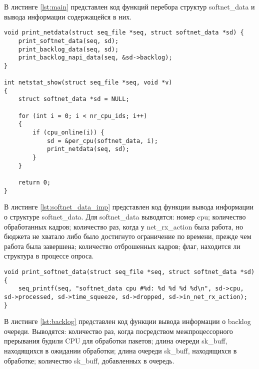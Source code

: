 В листинге \ref{lst:main} представлен код функций перебора структур softnet\_data и вывода информации содержащейся в них.

\begin{center}
	\captionsetup{justification=raggedright,singlelinecheck=off}
	\begin{lstlisting}[label=lst:main,caption=Функции перебора и вывода информации о структуре softnet\_data ,showstringspaces=false]
void print_netdata(struct seq_file *seq, struct softnet_data *sd) {
	print_softnet_data(seq, sd);
	print_backlog_data(seq, sd);
	print_backlog_napi_data(seq, &sd->backlog);
}

int netstat_show(struct seq_file *seq, void *v)
{
	struct softnet_data *sd = NULL;
	
	for (int i = 0; i < nr_cpu_ids; i++)
	{
		if (cpu_online(i)) {
			sd = &per_cpu(softnet_data, i);
			print_netdata(seq, sd);
		}
	}
	
	return 0;
}
	\end{lstlisting}
\end{center}
\FloatBarrier

В листинге \ref{lst:softnet_data_imp} представлен код функции вывода информации о структуре softnet\_data. Для softnet\_data выводятся: номер cpu; количество обработанных кадров; количество раз, когда у net\_rx\_action была работа, но бюджета не хватало либо было достигнуто ограничение по времени, прежде чем работа была завершена; количество отброшенных кадров; флаг, находится ли структура в процессе опроса.

\begin{center}
	\captionsetup{justification=raggedright,singlelinecheck=off}
	\begin{lstlisting}[label=lst:softnet_data_imp,caption=Функция вывода информации о структуре softnet\_data,showstringspaces=false]
void print_softnet_data(struct seq_file *seq, struct softnet_data *sd){
	seq_printf(seq, "softnet_data cpu #%d: %d %d %d %d\n", sd->cpu, sd->processed, sd->time_squeeze, sd->dropped, sd->in_net_rx_action);
}
	\end{lstlisting}
\end{center}
\FloatBarrier

В листинге \ref{lst:backlog} представлен код функции вывода информации о backlog очереди. Выводятся: количество раз, когда посредством межпроцессорного прерывания будили CPU для обработки пакетов; длина очереди sk\_buff, находящихся в ожидании обработки; длина очереди sk\_buff, находящихся в обработке; количество sk\_buff, добавленных в очередь.
\clearpage

